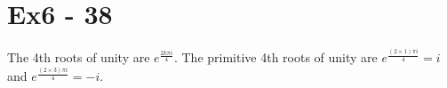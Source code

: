 \section*{Ex6 - 38}
The 4th roots of unity are $ e^{\frac{2k\pi i}{4}} $. The primitive 4th roots of unity are $ e^{\frac{(2 \times 1) \pi i}{4}} = i $ and $ e^{\frac{(2 \times 3)\pi i}{4}} = -i $.
